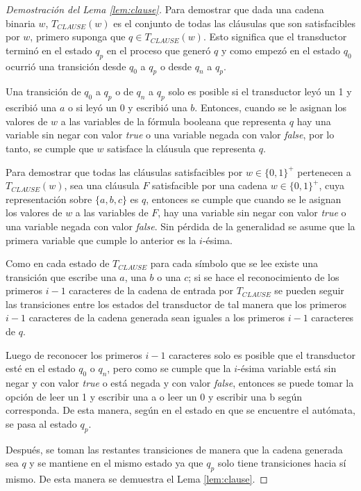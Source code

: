 \documentclass[12pt]{article}
\newcommand{\true}{\textit{true}}
\newcommand{\false}{\textit{false}}
\begin{document}
\begin{proof}[Demostración del Lema \ref{lem:clause}]
    Para demostrar que dada una cadena binaria $w$, $T_{CLAUSE}(w)$ es el conjunto de todas las cláusulas que 
    son satisfacibles por $w$, primero suponga que $q\in T_{CLAUSE}(w)$.  Esto significa que el transductor 
    terminó en el estado $q_p$ en el proceso que generó $q$ y como empezó en el estado $q_0$ ocurrió una 
    transición desde $q_0$ a $q_p$ o desde $q_n$ a $q_p$. 
    
    Una transición de $q_0$ a $q_p$ o de $q_n$ a $q_p$ solo es posible si el transductor leyó un 1 y 
    escribió una $a$ o si leyó un 0 y escribió una $b$. Entonces, cuando se le asignan los valores de 
    $w$ a las variables de la fórmula booleana que representa $q$ hay una variable sin negar con valor 
    \true{} o una variable negada con valor \false{}, por lo tanto, se cumple que $w$ satisface la cláusula 
    que representa $q$. 
    
    Para demostrar que todas las cláusulas satisfacibles por $w\in\{0,1\}^+$ pertenecen a $T_{CLAUSE}(w)$, 
    sea una cláusula $F$ satisfacible por una cadena $w\in\{0,1\}^+$, cuya representación sobre $\{a,b,c\}$ es $q$, 
    entonces se cumple que cuando se le asignan los valores de $w$ a las variables de $F$, hay una variable 
    sin negar con valor \true{} o una variable negada con valor \false{}. Sin pérdida de la generalidad se 
    asume que la primera variable que cumple lo anterior es la $i$-ésima.
    
    Como en cada estado de $T_{CLAUSE}$ para cada símbolo que se lee existe una transición que escribe 
    una $a$, una $b$ o una $c$; si se hace el reconocimiento de los primeros $i-1$ caracteres de la 
    cadena de entrada por $T_{CLAUSE}$ se pueden seguir las transiciones entre los estados del transductor 
    de tal manera que los primeros $i-1$ caracteres de la cadena generada sean iguales a los primeros 
    $i-1$ caracteres de $q$.
    
    Luego de reconocer los primeros $i-1$ caracteres solo es posible que el transductor esté en el estado $q_0$ o $q_n$, pero como se cumple que la $i$-ésima variable está sin negar y con valor \true{} o está negada y con valor \false{}, entonces se puede tomar la opción de leer un 1 y escribir una a o leer un 0 y escribir una b según corresponda.  De esta manera, según en el estado en que se encuentre el autómata, se pasa al estado $q_p$.
    
    Después, se toman las restantes transiciones de manera que la cadena generada sea $q$ y se mantiene en el mismo estado ya que $q_p$ solo tiene transiciones hacia sí mismo. De esta manera se demuestra el Lema \ref{lem:clause}. 
\end{proof}
\end{document}
